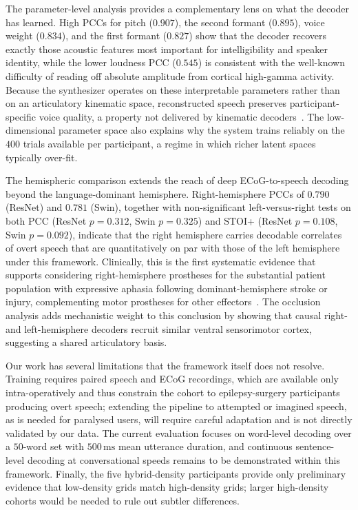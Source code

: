 \documentclass[11pt]{article}
\begin{document}
The parameter-level analysis provides a complementary lens on what the
decoder has learned. High PCCs for pitch ($0.907$), the second formant
($0.895$), voice weight ($0.834$), and the first formant ($0.827$) show
that the decoder recovers exactly those acoustic features most important
for intelligibility and speaker identity, while the lower loudness PCC
($0.545$) is consistent with the well-known difficulty of reading off
absolute amplitude from cortical high-gamma activity. Because the
synthesizer operates on these interpretable parameters rather than on an
articulatory kinematic space, reconstructed speech preserves
participant-specific voice quality, a property not delivered by kinematic
decoders~\cite{anumanchipalli2019speech}. The low-dimensional parameter
space also explains why the system trains reliably on the $400$ trials
available per participant, a regime in which richer latent spaces
typically over-fit.

The hemispheric comparison extends the reach of deep ECoG-to-speech
decoding beyond the language-dominant hemisphere. Right-hemisphere PCCs
of $0.790$ (ResNet) and $0.781$ (Swin), together with non-significant
left-versus-right tests on both PCC (ResNet $p=0.312$, Swin $p=0.325$)
and STOI+ (ResNet $p=0.108$, Swin $p=0.092$), indicate that the right
hemisphere carries decodable correlates of overt speech that are
quantitatively on par with those of the left hemisphere under this
framework. Clinically, this is the first systematic evidence that
supports considering right-hemisphere prostheses for the substantial
patient population with expressive aphasia following dominant-hemisphere
stroke or injury, complementing motor prostheses for other
effectors~\cite{moses2021neuroprosthesis,metzger2023highperformance,lorach2023walking}.
The occlusion analysis adds mechanistic weight to this conclusion by
showing that causal right- and left-hemisphere decoders recruit similar
ventral sensorimotor cortex, suggesting a shared articulatory basis.

Our work has several limitations that the framework itself does not
resolve. Training requires paired speech and ECoG recordings, which are
available only intra-operatively and thus constrain the cohort to
epilepsy-surgery participants producing overt speech; extending the
pipeline to attempted or imagined speech, as is needed for paralysed
users, will require careful adaptation and is not directly validated by
our data. The current evaluation focuses on word-level decoding over a
$50$-word set with $500\,\mathrm{ms}$ mean utterance duration, and
continuous sentence-level decoding at conversational speeds remains to
be demonstrated within this framework. Finally, the five hybrid-density
participants provide only preliminary evidence that low-density grids
match high-density grids; larger high-density cohorts would be needed to
rule out subtler differences.
\end{document}
